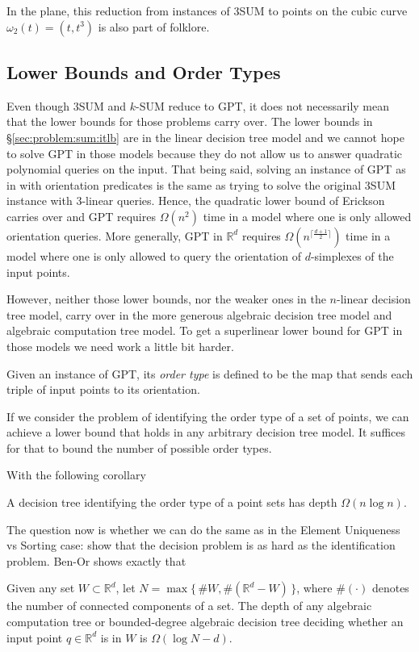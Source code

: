 In the plane, this reduction from instances of 3SUM to points on
the cubic curve \(\omega_2(t) = (t, t^3)\) is also part of folklore.

\subsection{Lower Bounds and Order Types}%
\label{sec:problem:pol:lb}

Even though 3SUM and \(k\)-SUM reduce to GPT, it does not necessarily mean that
the lower bounds for those problems carry over.
%
The lower bounds in
\S\ref{sec:problem:sum:itlb} are in the linear decision tree model and we
cannot hope to solve GPT in those models because they do not allow us to answer
quadratic polynomial queries on the input.
%
That being said, solving an instance of GPT as in  with
orientation predicates is the same as trying to solve the original 3SUM
instance with \(3\)-linear queries. Hence, the quadratic lower bound of
Erickson~\cite{Er99a} carries over and GPT requires \(\Omega(n^2)\) time in a
model where one is only allowed orientation queries. More generally, GPT in
\(\mathbb{R}^d\) requires \(\Omega(n^{\lceil \frac{d+1}{2} \rceil})\) time in a
model where one is only allowed to query the orientation of \(d\)-simplexes of
the input points.

However, neither those lower bounds, nor the weaker ones in the \(n\)-linear
decision tree model, carry over in the more generous algebraic decision
tree model and algebraic computation tree model.
%
To get a superlinear lower bound for GPT in those models we need work a little
bit harder.

Given an instance of GPT, its \emph{order type} is defined to be the map that
sends each triple of input points to its orientation.
%

%
If we consider the problem of identifying the order type of a set of points, we
can achieve a lower bound that holds in any arbitrary decision tree model. It
suffices for that to bound the number of possible order types.
%

%
With the following corollary
\begin{corollary}
    A decision tree identifying the order type of a point sets has depth
    \(\Omega(n \log n)\).
\end{corollary}

The question now is whether we can do the same as in the Element Uniqueness vs
Sorting case: show that the decision problem is as hard as the identification
problem. Ben-Or shows exactly that
%
\begin{theorem}[name=Ben-Or~\cite{Be83},label=thm:Be83]
    Given any set \(W \subset \mathbb{R}^d\),
    let \(N = \max \{\, \# W , \#(\mathbb{R}^d - W)\,\}\),
    where \(\#(\cdot)\) denotes the number of connected components of a set.
    The depth of any algebraic
    computation tree or bounded-degree algebraic decision tree
    deciding whether an input point \(q \in \mathbb{R}^d\) is in \(W\)
    is \(\Omega(\log N - d)\).
\end{theorem}

